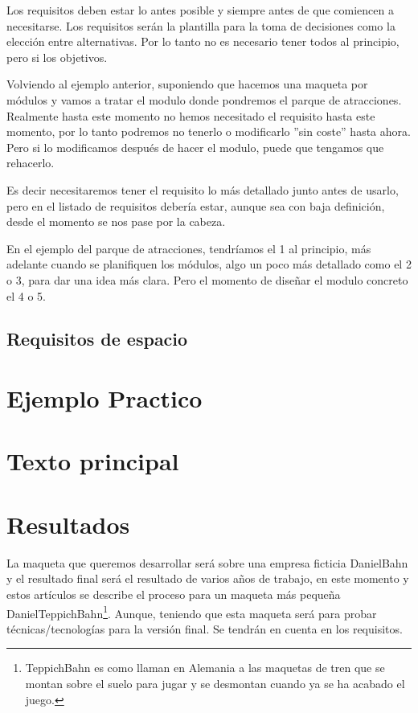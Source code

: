 Los requisitos deben estar lo antes posible y siempre antes de que comiencen a necesitarse.
Los requisitos serán la plantilla para la toma de decisiones como la elección entre alternativas.
Por lo tanto no es necesario tener todos al principio, pero si los objetivos.

Volviendo al ejemplo anterior, suponiendo que hacemos una maqueta por módulos y vamos a tratar el modulo
donde pondremos el parque de atracciones. Realmente hasta este momento no hemos necesitado el requisito hasta
este momento, por lo tanto podremos no tenerlo o modificarlo ”sin coste” hasta ahora.
Pero si lo modificamos después de hacer el modulo, puede que tengamos que rehacerlo.

Es decir necesitaremos tener el requisito lo más detallado junto antes de usarlo, pero en el listado de
requisitos debería estar, aunque sea con baja definición, desde el momento se nos pase por la cabeza.

En el ejemplo del parque de atracciones, tendríamos el 1 al principio, más adelante cuando se planifiquen
los módulos, algo un poco más detallado como el 2 o 3, para dar una idea más clara.
Pero el momento de diseñar el modulo concreto el 4 o 5.
\subsection{Requisitos de espacio}

\section{Ejemplo Practico}
\section{Texto principal}

\section{Resultados}

La maqueta que queremos desarrollar será sobre una empresa ficticia DanielBahn y el resultado final será
el resultado de varios años de trabajo, en este momento y estos artículos se describe el proceso para un
maqueta más pequeña DanielTeppichBahn\footnote{TeppichBahn es como llaman en Alemania a las maquetas de
    tren que se montan sobre el suelo para jugar y se desmontan cuando ya se ha acabado el juego.}.
Aunque, teniendo que esta maqueta será para probar técnicas/tecnologías para la versión final.
Se tendrán en cuenta en los requisitos.

